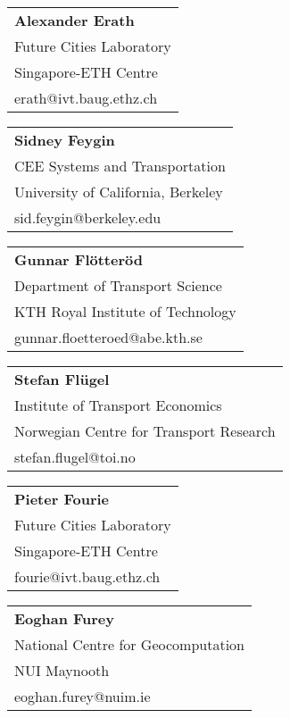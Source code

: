 \begin{tabular}[width=0.48\textwidth]{@{}l}
\textbf{Alexander Erath} \\
Future Cities Laboratory \\
Singapore-ETH Centre\\
erath@ivt.baug.ethz.ch \\
\end{tabular}

\begin{tabular}[width=0.48\textwidth]{@{}l}
\textbf{Sidney Feygin} \\
CEE Systems and Transportation \\
University of California, Berkeley \\
sid.feygin@berkeley.edu \\
\end{tabular}

\begin{tabular}[width=0.48\textwidth]{@{}l}
\textbf{Gunnar Flötteröd} \\
Department of Transport Science \\
KTH Royal Institute of Technology \\
gunnar.floetteroed@abe.kth.se \\
\end{tabular}

\begin{tabular}[width=0.48\textwidth]{@{}l}
\textbf{Stefan Flügel} \\
Institute of Transport Economics \\
Norwegian Centre for Transport Research \\
stefan.flugel@toi.no \\
\end{tabular}

\begin{tabular}[width=0.48\textwidth]{@{}l}
\textbf{Pieter Fourie} \\
Future Cities Laboratory \\
Singapore-ETH Centre\\
fourie@ivt.baug.ethz.ch \\
\end{tabular}

\begin{tabular}[width=0.48\textwidth]{@{}l}
\textbf{Eoghan Furey} \\
National Centre for Geocomputation \\
NUI Maynooth \\
eoghan.furey@nuim.ie \\
\end{tabular}


